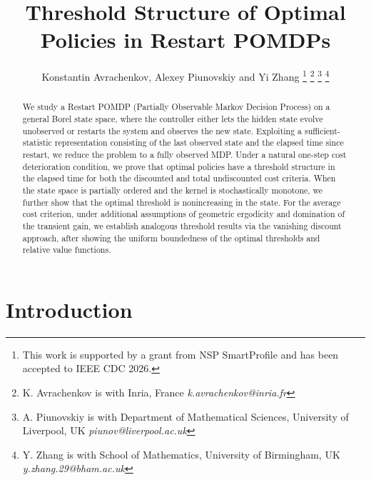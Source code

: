 \documentclass[letterpaper,10pt,conference]{ieeeconf}  %
\title{\LARGE \bf
Threshold Structure of Optimal Policies in Restart POMDPs
}
\author{Konstantin Avrachenkov, Alexey Piunovskiy and Yi Zhang%
\thanks{This work is supported by a grant from NSP SmartProfile and has been accepted to IEEE CDC 2026.}%
\thanks{K. Avrachenkov is with Inria, France
        {\it k.avrachenkov@inria.fr}}%
\thanks{A. Piunovskiy is with Department of Mathematical Sciences, University of Liverpool, UK
        {\it piunov@liverpool.ac.uk}}%
\thanks{Y. Zhang is with School of Mathematics, University of Birmingham, UK
        {\it y.zhang.29@bham.ac.uk}}%
}
\begin{document}
\maketitle
\thispagestyle{empty}
\pagestyle{empty}

\begin{abstract}
We study a Restart POMDP (Partially Observable Markov Decision Process) on a general Borel state space, where the controller either lets the hidden state evolve unobserved or restarts the system and observes the new state. Exploiting a sufficient-statistic representation consisting of the last observed state and the elapsed time since restart, we reduce the problem to a fully observed MDP. Under a natural one-step cost deterioration condition, we prove that optimal policies have a threshold structure in the elapsed time for both the discounted and total undiscounted cost criteria. When the state space is partially ordered and the kernel is stochastically monotone, we further show that the optimal threshold is nonincreasing in the state. For the average cost criterion, under additional assumptions of geometric ergodicity and domination of the transient gain, we establish analogous threshold results via the vanishing discount approach, after showing the uniform boundedness of the optimal thresholds and relative value functions.
\end{abstract}

\section{Introduction}

\end{document}
